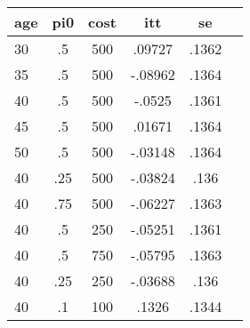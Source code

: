 \begin{table}[htbp]
\begin{tabular}{lccccc} \hline \hline
 \multicolumn{1}{c}{ age }  & pi0  & cost  & itt  & se  \\  \hline 
       30 &        .5 &       500 &    .09727 &     .1362 \\  
       35 &        .5 &       500 &   -.08962 &     .1364 \\  
       40 &        .5 &       500 &    -.0525 &     .1361 \\  
       45 &        .5 &       500 &    .01671 &     .1364 \\  
       50 &        .5 &       500 &   -.03148 &     .1364 \\  
       40 &       .25 &       500 &   -.03824 &      .136 \\  
       40 &       .75 &       500 &   -.06227 &     .1363 \\  
       40 &        .5 &       250 &   -.05251 &     .1361 \\  
       40 &        .5 &       750 &   -.05795 &     .1363 \\  
       40 &       .25 &       250 &   -.03688 &      .136 \\  
       40 &        .1 &       100 &     .1326 &     .1344 \\  
\hline \hline \end{tabular}
\end{table}
